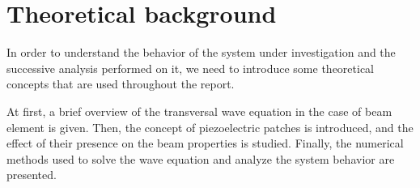 \section{Theoretical background}
\label{sec:theoretical_background}

In order to understand the behavior of the system under investigation and the successive analysis performed on it, we need to introduce some theoretical concepts that are used throughout the report.

At first, a brief overview of the transversal wave equation in the case of beam element is given.
Then, the concept of piezoelectric patches is introduced, and the effect of their presence on the beam properties is studied.
Finally, the numerical methods used to solve the wave equation and analyze the system behavior are presented.




